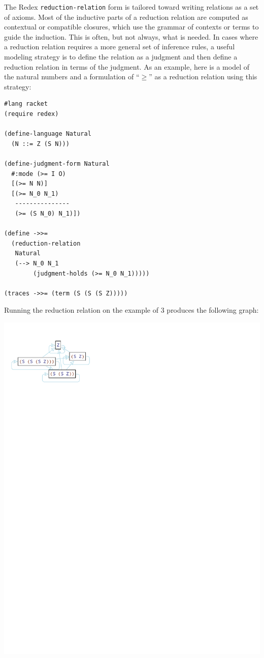The Redex {\tt reduction-relation} form is tailored toward writing
relations as a set of axioms.  Most of the inductive parts of a
reduction relation are computed as contextual or compatible closures,
which use the grammar of contexts or terms to guide the induction.
This is often, but not always, what is needed.  In cases where a
reduction relation requires a more general set of inference rules, a
useful modeling strategy is to define the relation as a judgment and
then define a reduction relation in terms of the judgment.  As an
example, here is a model of the natural numbers and a formulation of
``$\geq$'' as a reduction relation using this strategy:
\begin{verbatim}
#lang racket
(require redex)

(define-language Natural
  (N ::= Z (S N)))

(define-judgment-form Natural
  #:mode (>= I O)
  [(>= N N)]
  [(>= N_0 N_1)
   ---------------
   (>= (S N_0) N_1)])

(define ->>= 
  (reduction-relation 
   Natural
   (--> N_0 N_1
        (judgment-holds (>= N_0 N_1)))))

(traces ->>= (term (S (S (S Z)))))
\end{verbatim}

Running the reduction relation on the example of 3 produces the
following graph:
\begin{center}
\includegraphics{figs/gte-graph.pdf}
\end{center}


